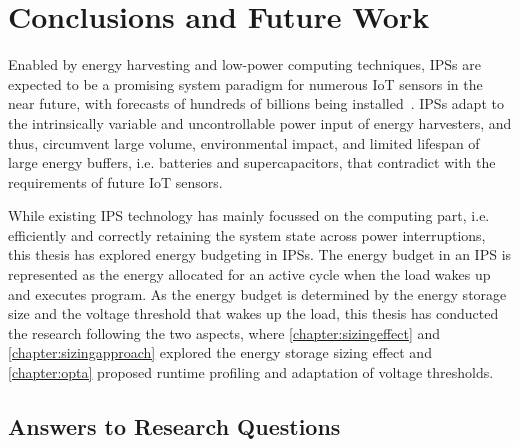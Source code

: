 \chapter{Conclusions and Future Work} \label{chapter:conclusion}

Enabled by energy harvesting and low-power computing techniques, IPSs are expected to be a promising system paradigm for numerous IoT sensors in the near future, with forecasts of hundreds of billions being installed~\cite{sparks2017trillion}.
IPSs adapt to the intrinsically variable and uncontrollable power input of energy harvesters, and thus, circumvent large volume, environmental impact, and limited lifespan of large energy buffers, i.e. batteries and supercapacitors, that contradict with the requirements of future IoT sensors.

While existing IPS technology has mainly focussed on the computing part, i.e. efficiently and correctly retaining the system state across power interruptions, this thesis has explored energy budgeting in IPSs. 
The energy budget in an IPS is represented as the energy allocated for an active cycle when the load wakes up and executes program. 
As the energy budget is determined by the energy storage size and the voltage threshold that wakes up the load, this thesis has conducted the research following the two aspects, where \cref{chapter:sizingeffect} and \cref{chapter:sizingapproach} explored the energy storage sizing effect and \cref{chapter:opta} proposed runtime profiling and adaptation of voltage thresholds. 

\section{Answers to Research Questions}


